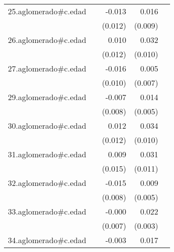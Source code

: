 {\begin{longtable}{l*{4}{D{.}{.}{-1}}}
\addlinespace
25.aglomerado#c.edad&                     &      -0.013         &       0.016         &                     \\
            &                     &     (0.012)         &     (0.009)         &                     \\
\addlinespace
26.aglomerado#c.edad&                     &       0.010         &       0.032\sym{**} &                     \\
            &                     &     (0.012)         &     (0.010)         &                     \\
\addlinespace
27.aglomerado#c.edad&                     &      -0.016         &       0.005         &                     \\
            &                     &     (0.010)         &     (0.007)         &                     \\
\addlinespace
29.aglomerado#c.edad&                     &      -0.007         &       0.014\sym{**} &                     \\
            &                     &     (0.008)         &     (0.005)         &                     \\
\addlinespace
30.aglomerado#c.edad&                     &       0.012         &       0.034\sym{**} &                     \\
            &                     &     (0.012)         &     (0.010)         &                     \\
\addlinespace
31.aglomerado#c.edad&                     &       0.009         &       0.031\sym{**} &                     \\
            &                     &     (0.015)         &     (0.011)         &                     \\
\addlinespace
32.aglomerado#c.edad&                     &      -0.015         &       0.009         &                     \\
            &                     &     (0.008)         &     (0.005)         &                     \\
\addlinespace
33.aglomerado#c.edad&                     &      -0.000         &       0.022\sym{***}&                     \\
            &                     &     (0.007)         &     (0.003)         &                     \\
\addlinespace
34.aglomerado#c.edad&                     &      -0.003         &       0.017\sym{**} &                     \\

\end{longtable}}
